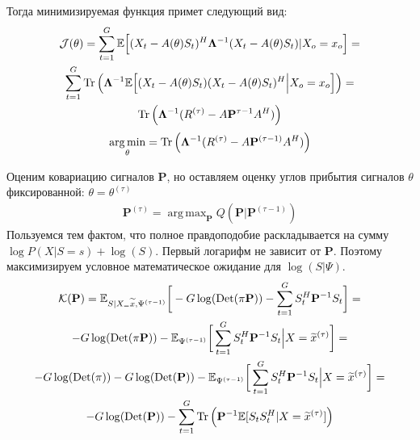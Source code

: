 \documentclass[11pt]{article}
\newcommand{\Expect}{\mathbb{E}}
\DeclareMathOperator*{\argmax}{arg\,max}
\DeclareMathOperator*{\argmin}{arg\,min}
\DeclareMathOperator{\Det}{Det}
\begin{document}
Тогда минимизируемая функция примет следующий вид:
\begin{equation*}
\begin{gathered}
\mathcal{J}(\theta) = \sum_{t=1}^G \Expect \Big[ (X_t-A(\theta)S_t)^H\mathbf{\Lambda}^{-1}(X_t-A(\theta)S_t) \text{|}X_o = x_o\Big] = \\
\sum_{t=1}^G \Tr \Big( \mathbf{\Lambda}^{-1} \Expect \Big[ (X_t-A(\theta)S_t)(X_t-A(\theta)S_t)^H \Big{|}X_o = x_o \Big] \Big) = \\
\Tr \Big( \mathbf{\Lambda}^{-1} ({R}^{(\tau)} - A\mathbf{P}^{\tau-1}A^H) \Big)
\end{gathered}
\end{equation*}
\begin{equation}
\argmin_{\theta} = \Tr \Big( \mathbf{\Lambda}^{-1} ({R}^{(\tau)} - A\mathbf{P}^{(\tau-1)}A^H) \Big)
\end{equation}
\begin{center}
\fontsize{14}{18}\selectfont {}
\end{center}
Оценим ковариацию сигналов $\mathbf{P}$, но оставляем оценку углов прибытия сигналов $\theta$ фиксированной: $\theta = \theta^{(\tau)}$
\begin{equation*}
\begin{gathered}
\mathbf{P}^{(\tau)}= \argmax_{\mathbf{P}} Q(\mathbf{P} | \mathbf{P}^{(\tau-1)}) 
\end{gathered}
\end{equation*}
Пользуемся тем фактом, что полное правдоподобие раскладывается на сумму $\log P(X|S=s) + \log(S)$. Первый логарифм не зависит от $\mathbf{P}$. Поэтому максимизируем условное математическое ожидание  для $\log(S| \Psi)$.
\begin{equation*}
\begin{gathered}
\mathcal{K}(\mathbf{P}) = \Expect_{S|X_=\widetilde{x}, \Psi^{(\tau-1)}}\bigg[- G \log(\Det(\pi \mathbf{P})) - \sum_{t=1}^G S_t^H \mathbf{P}^{-1}S_t\bigg] = \\
- G \log(\Det(\pi \mathbf{P})) - \Expect_{\Psi^{(\tau-1)}}\bigg[ \sum_{t=1}^G S_t^H \mathbf{P}^{-1}S_t \Big | X = \widetilde{x}^{(\tau)} \bigg ] = \\
- G \log(\Det(\pi)) - G \log(\Det(\mathbf{P})) - \Expect_{\Psi^{(\tau-1)}}\bigg[ \sum_{t=1}^G S_t^H \mathbf{P}^{-1}S_t \Big | X = \widetilde{x}^{(\tau)} \bigg ] = \\
 - G \log(\Det(\mathbf{P})) - \sum_{t=1}^G \Tr\Big(\mathbf{P}^{-1} \Expect[S_t S_t^H | X = \widetilde{x}^{(\tau)}]\Big)
\end{gathered}
\end{equation*}
\end{document}
